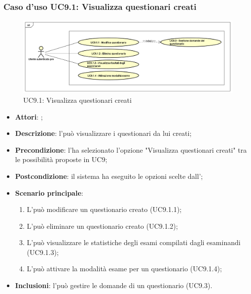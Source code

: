 		\subsubsection{Caso d'uso UC9.1: Visualizza questionari creati}
		\label{UC9.1}
		\begin{figure}[h]
			\centering
		\includegraphics[scale=0.5,keepaspectratio]{UML/UC9_1.png}
			\caption{UC9.1: Visualizza questionari creati}
		\end{figure}
		\FloatBarrier
		\begin{itemize}
			\item \textbf{Attori}: \uaupro;
			\item \textbf{Descrizione}: l'\uaupro può visualizzare i questionari da lui creati;
			\item \textbf{Precondizione}: l'\uaupro ha selezionato l'opzione "Visualizza questionari creati" tra le possibilità proposte in UC9;
			\item \textbf{Postcondizione}: il sistema ha eseguito le opzioni scelte dall'\uaupro;
			\item \textbf{Scenario principale}: 
				\begin{enumerate}
					\item L'\uaupro può modificare un questionario creato (UC9.1.1);
					\item L'\uaupro può eliminare un questionario creato (UC9.1.2);
					\item L'\uaupro può visualizzare le statistiche degli esami compilati dagli esaminandi (UC9.1.3);
					\item L'\uaupro può attivare la modalità esame per un questionario (UC9.1.4);
				\end{enumerate}
				\item \textbf{Inclusioni}: l'\uaupro può gestire le domande di un questionario (UC9.3).
		\end{itemize}
		
